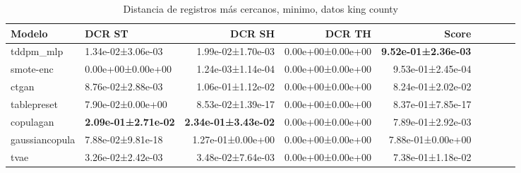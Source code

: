 \begin{table}[H]
\centering
\fontsize{10}{14}\selectfont
\caption{Distancia de registros más cercanos, minimo, datos king county}
\label{table-dcr-king county-a}
\begin{tabular}{|l|l|r|r|r|r|r|r|r|}
\hline
\rowcolor[gray]{0.8}
Modelo & DCR ST & DCR SH & DCR TH & \textbf{Score} \\
\hline tddpm\_mlp & 1.34e-02±3.06e-03 & 1.99e-02±1.70e-03 & 0.00e+00±0.00e+00 & \bfseries 9.52e-01±2.36e-03 \\
\hline smote-enc & \cellcolor[rgb]{0.9, 0.54, 0.52} 0.00e+00±0.00e+00 & \cellcolor[rgb]{0.9, 0.54, 0.52} 1.24e-03±1.14e-04 & 0.00e+00±0.00e+00 & 9.53e-01±2.45e-04 \\
\hline ctgan & 8.76e-02±2.88e-03 & 1.06e-01±1.12e-02 & 0.00e+00±0.00e+00 & 8.24e-01±2.02e-02 \\
\hline tablepreset & 7.90e-02±0.00e+00 & 8.53e-02±1.39e-17 & 0.00e+00±0.00e+00 & 8.37e-01±7.85e-17 \\
\hline copulagan & \bfseries 2.09e-01±2.71e-02 & \bfseries 2.34e-01±3.43e-02 & 0.00e+00±0.00e+00 & 7.89e-01±2.92e-03 \\
\hline gaussiancopula & 7.88e-02±9.81e-18 & 1.27e-01±0.00e+00 & 0.00e+00±0.00e+00 & 7.88e-01±0.00e+00 \\
\hline tvae & 3.26e-02±2.42e-03 & 3.48e-02±7.64e-03 & 0.00e+00±0.00e+00 & \cellcolor[rgb]{0.9, 0.54, 0.52} 7.38e-01±1.18e-02 \\
\hline
\end{tabular}
\end{table}
